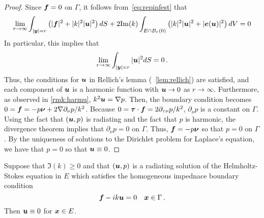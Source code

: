 \begin{proof}
Since ${\boldsymbol f} = 0$ on $\Gamma$, it follows
from~\cref{eq:repinfest} that
\begin{equation}
\lim_{r\to\infty}
\int_{|{\boldsymbol y}|=r} \left( |{\boldsymbol f}|^2 + |k|^2 |{\boldsymbol u}|^2 \right) dS +
2 {\textrm{\textup{Im}}}(k) \int_{E \cap B_{r}(0)} \left(|k|^2 |{\boldsymbol u}|^2 + |{\boldsymbol e}({\boldsymbol u})|^2 \right)
dV = 0
\end{equation} 
In particular, this implies that
\begin{equation}
\lim_{r\to\infty} \int_{|{\boldsymbol y}|=r} |{\boldsymbol u}|^2 dS = 0 \, .
\end{equation}
Thus, the conditions for ${\boldsymbol u}$ in Rellich's lemma (~\cref{lem:rellich})
are satisfied, and each component of ${\boldsymbol u}$ is a harmonic function
with ${\boldsymbol u} \to 0$ as $r \to \infty$. Furthermore, as observed
in \cref{rmk:harmu}, $k^2 {\boldsymbol u} = \nabla p$. Then, the boundary
condition becomes $0 = {\boldsymbol f} = -p {\boldsymbol \nu} + 2 \nabla \partial_\nu p/k^2$.
Because $0 = {\boldsymbol \tau} \cdot {\boldsymbol f} = 2\partial_{\tau\nu} p/k^2$,
$\partial_\nu p $ is a constant on $\Gamma$. Using the
fact that $({\boldsymbol u},p)$ is radiating and the fact that $p$ is harmonic,
the divergence theorem implies that $\partial_\nu p=0$ on $\Gamma$.
Thus, ${\boldsymbol f} = -p{\boldsymbol \nu}$ so that $p = 0$ on $\Gamma$. By the uniqueness
of solutions to the Dirichlet problem for Laplace's equation,
we have that $p=0$ so that ${\boldsymbol u} \equiv 0$.

\end{proof}

\begin{thrm}
Suppose that $\Im(k) \geq 0$ and that
$({\boldsymbol u},p)$ is a radiating solution of the
Helmholtz-Stokes equation in $E$ which satisfies
the homogeneous impednace boundary condition
\begin{equation}
{\boldsymbol f} - i k {\boldsymbol u} = 0 \quad {\boldsymbol x} \in \Gamma \, .
\end{equation}
Then ${\boldsymbol u} \equiv 0$ for ${\boldsymbol x} \in E$.
\end{thrm}

